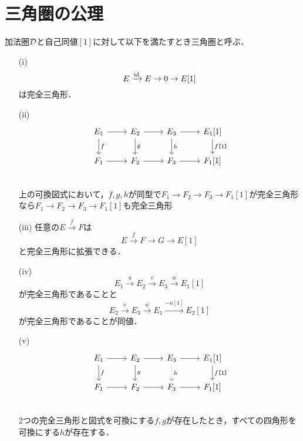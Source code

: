 \documentclass[leqno]{ltjsarticle}
\begin{document}
\section{三角圏の公理}
	加法圏${\mathcal D}$と自己同値$[1]$に対して以下を満たすとき三角圏と呼ぶ．
	\begin{itemize}
		\item[(i)]
			\[E\xrightarrow{\mathrm{id}}E\rightarrow 0 \rightarrow E[1]\]
			は完全三角形．
		\item[(ii)]
			\[
		\begin{tikzcd}
			E_1\ar[r]\ar[d,"f"]& E_2\ar[r]\ar[d,"g"]& E_3\ar[r]\ar[d,"h"] & E_1[1]\ar[d,"f\texttt{[1]}"]\\
			F_1\ar[r]& F_2\ar[r]& F_3\ar[r] & F_1[1]\\
		\end{tikzcd}
			\]
			上の可換図式において，$f,g,h$が同型で$F_1\rightarrow F_2\rightarrow F_3 \rightarrow F_1[1]$が完全三角形なら$F_1\rightarrow F_2\rightarrow F_3 \rightarrow F_1[1]$も完全三角形
		\item[(iii)]
			任意の$E\xrightarrow{f}F$は
			\[E\xrightarrow{f} F\rightarrow G \rightarrow E[1]\]
		と完全三角形に拡張できる．
	\item[(iv)]
		\[
			E_1\xrightarrow{u} E_2\xrightarrow{v} E_3\xrightarrow{w}  E_1[1]
	\]
	が完全三角形であることと
	\[
		E_2\xrightarrow{v} E_3\xrightarrow{w} E_1\xrightarrow{-u[1]}  E_2[1]
	\]
	が完全三角形であることが同値．
	\item[(v)]
		\[
		\begin{tikzcd}
			E_1\ar[r]\ar[d,"f"]& E_2\ar[r]\ar[d,"g"]& E_3\ar[r]\ar[d,"h",dotted] & E_1[1]\ar[d,"f\texttt{[1]}"]\\
			F_1\ar[r]& F_2\ar[r]& F_3\ar[r] & F_1[1]\\
		\end{tikzcd}
	\]
	2つの完全三角形と図式を可換にする$f,g$が存在したとき，すべての四角形を可換にする$h$が存在する．


\end{itemize}
\end{document}
